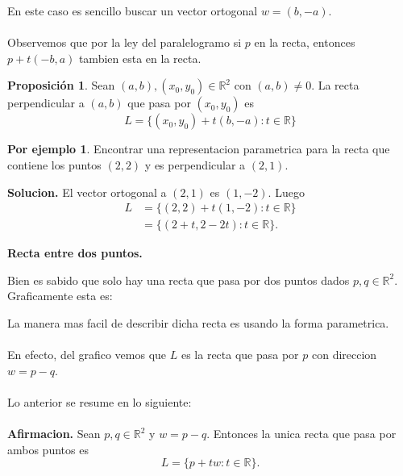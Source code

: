 \documentclass{article}
\theoremstyle{definition}
\theoremstyle{definition}
\newtheorem{prop}[teo]{Proposición}
\newtheorem*{ej}{Por ejemplo}
\theoremstyle{remark}
\begin{document}
En este caso es sencillo buscar un vector ortogonal $w=(b,-a)$.\\\\
Observemos que por la ley del paralelogramo si $p$ en la recta, entonces $p+t(-b,a)$ tambien esta en la recta.
\begin{prop}
  Sean $(a,b),(x_0,y_0) \in \mathbb{R}^2$ con $(a,b) \neq 0$. La recta perpendicular a $(a,b)$ que pasa por $(x_0,y_0)$ es \[
    L=\big\{(x_0,y_0)+t(b,-a) : t \in \mathbb{R}\big\}
  \]
\end{prop}
\begin{ej}
  Encontrar una representacion parametrica para la recta que contiene los puntos $(2,2)$ y es perpendicular a $(2,1)$.
\end{ej}
\textbf{Solucion.} 
El vector ortogonal a $(2,1)$ es $(1,-2)$. Luego \[
  \begin{aligned}
    L &= \big\{(2,2)+t(1,-2) : t \in \mathbb{R}\big\}\\
     &=\big\{(2+t,2-2t) : t \in \mathbb{R}\big\}.
  \end{aligned}
\]
\begin{center}
\textbf{Recta entre dos puntos.}
\end{center}
Bien es sabido que solo hay una recta que pasa por dos puntos dados $p,q \in \mathbb{R}^2$. Graficamente esta es: 
\begin{figure}[h]
\centering
\def\svgwidth{0.75\textwidth}

\end{figure}

La manera mas facil de describir dicha recta es usando la forma parametrica. \\\\
 En efecto, del grafico vemos que $L$ es la recta que pasa por $p$ con direccion $w=p-q$.
\\\\
Lo anterior se resume en lo siguiente: 
\\\\
\textbf{Afirmacion.} Sean $p,q \in \mathbb{R}^2$ y $w=p-q$. Entonces la unica recta que pasa por ambos puntos es \[
  L=\{p + tw : t \in \mathbb{R}\}.
\]
\pagebreak
\end{document}
